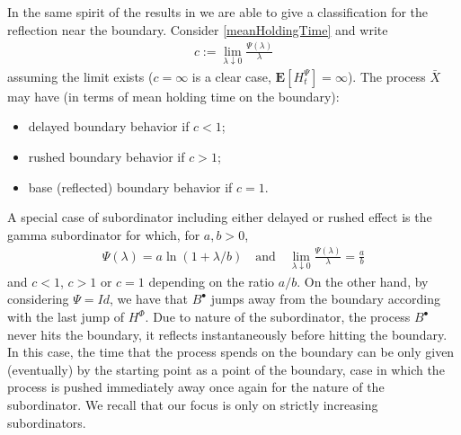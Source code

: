 \documentclass[11pt,a4paper]{article}
\theoremstyle{plain}
\theoremstyle{definition}
\theoremstyle{remark}
\begin{document}
		In the same spirit of the results in \cite{capitanelli2020delayed} we are able to give a classification for the reflection near the boundary. Consider \eqref{meanHoldingTime} and write
		\begin{align*}
			c := \lim_{\lambda \downarrow 0} \frac{\Psi(\lambda)}{\lambda}
		\end{align*}
		assuming the limit exists ($c=\infty$ is a clear case, $\mathbf{E}[H^\Psi_t] = \infty$). The process $\bar{X}$ may have (in terms of mean holding time on the boundary):
		\begin{itemize}  
			\item[B1)] delayed boundary behavior if $c<1$;
			\item[B2)] rushed boundary behavior if $c>1$;
			\item[B3)] base (reflected) boundary behavior if $c=1$.
		\end{itemize}
		A special case of subordinator including either delayed or rushed effect is the gamma subordinator for which, for $a,b>0$,
		\begin{align*}
			\Psi(\lambda) = a \ln (1+ \lambda/b) \quad \textrm{and} \quad \lim_{\lambda \downarrow 0} \frac{\Psi(\lambda)}{\lambda} = \frac{a}{b} 
		\end{align*}
		and $c<1$, $c>1$ or $c=1$ depending on the ratio $a/b$. On the other hand, by considering $\Psi=Id$, we have that $B^\bullet$ jumps away from the boundary according with the last jump of $H^\Phi$. Due to nature of the subordinator, the process $B^\bullet$ never hits the boundary, it reflects instantaneously before hitting the boundary. In this case, the time that the process spends on the boundary can be only given (eventually) by the starting point as a point of the boundary, case in which the process is pushed immediately away once again for the nature of the subordinator. We recall that our focus is only on strictly increasing subordinators. 
		
\end{document}

